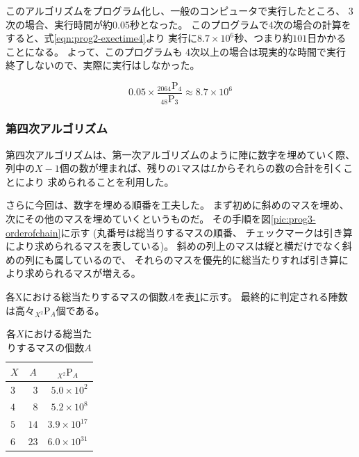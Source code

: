 このアルゴリズムをプログラム化し、一般のコンピュータで実行したところ、
3次の場合、実行時間が約0.05秒となった。
このプログラムで4次の場合の計算をすると、式\ref{eqn:prog2-exectime4}より
実行に$8.7 \times 10^6$秒、つまり約$101$日かかることになる。
よって、このプログラムも
4次以上の場合は現実的な時間で実行終了しないので、実際に実行はしなかった。

\begin{equation} \label{eqn:prog2-exectime4}
0.05 \times \frac{_{2064} \mathrm{P} _4}{_{48} \mathrm{P} _3} \approx 8.7 \times 10^6
\end{equation}

\subsubsection{第四次アルゴリズム}
第四次アルゴリズムは、第一次アルゴリズムのように陣に数字を埋めていく際、
列中の$X-1$個の数が埋まれば、残りの$1$マスは$L$からそれらの数の合計を引くことにより
求められることを利用した。

さらに今回は、数字を埋める順番を工夫した。
まず初めに斜めのマスを埋め、次にその他のマスを埋めていくというものだ。
その手順を図\ref{pic:prog3-orderofchain}に示す
(丸番号は総当りするマスの順番、
チェックマークは引き算により求められるマスを表している)。
斜めの列上のマスは縦と横だけでなく斜めの列にも属しているので、
それらのマスを優先的に総当たりすれば引き算により求められるマスが増える。

各Xにおける総当たりするマスの個数$A$を表\ref{tab:chaincount-each-X}に示す。
最終的に判定される陣数は高々$_{X^2} \mathrm{P} _A$個である。

\begin{table}[htb]
	\begin{center}
	\begin{tabular}{|l|r|r|}
\hline \hline
\multicolumn{1}{|c|}{$X$} & \multicolumn{1}{|c|}{$A$} & \multicolumn{1}{|c|}{$_{X^2} \mathrm{P} _A$} \\
\hline \hline
$3$ & $3$ & $5.0 \times 10^2$ \\
$4$ & $8$ & $5.2 \times 10^8$ \\
$5$ & $14$ & $3.9 \times 10^{17}$ \\
$6$ & $23$ & $6.0 \times 10^{31}$ \\
\hline
	\end{tabular}
	\end{center}
	\caption{各$X$における総当たりするマスの個数$A$}
	\label{tab:chaincount-each-X}
\end{table}

